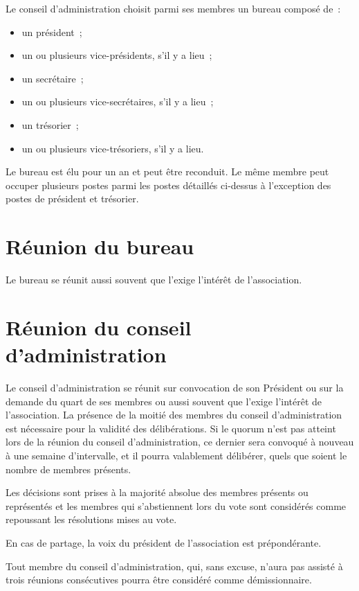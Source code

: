 \documentclass{article}
\begin{document}
Le conseil d'administration choisit parmi ses membres un bureau
composé de~:

\begin{itemize}
\item un président~;
\item un ou plusieurs vice-présidents, s'il y a lieu~;
\item un secrétaire~;
\item un ou plusieurs vice-secrétaires, s'il y a lieu~;
\item un trésorier~;
\item un ou plusieurs vice-trésoriers, s'il y a lieu.
\end{itemize}

Le bureau est élu pour un an et peut être reconduit. Le même membre
peut occuper plusieurs postes parmi les postes détaillés ci-dessus à
l'exception des postes de président et trésorier.

\section{Réunion du bureau}
\label{sec:reunion-du-bureau}

Le bureau se réunit aussi souvent que l'exige l'intérêt de
l'association.

\section{Réunion du conseil d'administration}
\label{sec:reunion-du-conseil-d-administration}

Le conseil d'administration se réunit sur convocation de son Président
ou sur la demande du quart de ses membres ou aussi souvent que l'exige
l'intérêt de l'association. La présence de la moitié des membres du
conseil d'administration est nécessaire pour la validité des
délibérations. Si le quorum n'est pas atteint lors de la réunion du
conseil d'administration, ce dernier sera convoqué à nouveau à une
semaine d'intervalle, et il pourra valablement délibérer, quels que
soient le nombre de membres présents.

Les décisions sont prises à la majorité absolue des membres présents
ou représentés et les membres qui s'abstiennent lors du vote sont
considérés comme repoussant les résolutions mises au vote.

En cas de partage, la voix du président de l'association est
prépondérante.

Tout membre du conseil d'administration, qui, sans excuse, n'aura pas
assisté à trois réunions consécutives pourra être considéré comme
démissionnaire.
\end{document}
